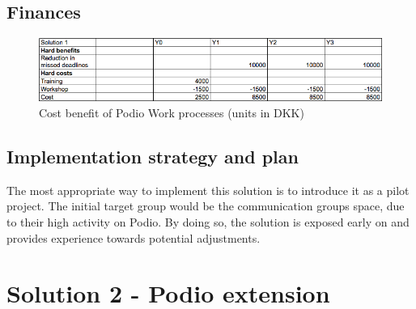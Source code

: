 \subsection{Finances}
\begin{figure}[h!]
  \centering
\includegraphics[scale=0.5]{Pictures/cost-benefit1.png}
    \caption{Cost benefit of Podio Work processes (units in DKK)}
\end{figure}


\subsection{Implementation strategy and plan} 
The most appropriate way to implement this solution is to introduce it as a pilot project. The initial target group would be the communication groups space, due to their high activity on Podio. By doing so, the solution is exposed early on and provides experience towards potential adjustments.


\section{Solution 2 - Podio extension}

